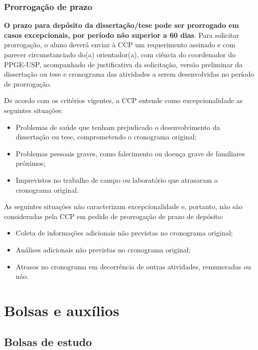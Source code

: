 \subsection{Prorrogação de prazo}

\textbf{O prazo para depósito da dissertação/tese pode ser prorrogado
  em casos excepcionais, por período não superior a 60 dias}. Para
solicitar prorrogação, o aluno deverá enviar à CCP um requerimento
assinado e com parecer circunstanciado do(a) orientador(a), com
ciência do coordenador do PPGE-USP, acompanhado de justificativa da
solicitação, versão preliminar da dissertação ou tese e cronograma das
atividades a serem desenvolvidas no período de prorrogação.

De acordo com os critérios vigentes, a CCP entende como
excepcionalidade as seguintes situações:

\begin{itemize}
\item Problemas de saúde que tenham prejudicado o desenvolvimento da
  dissertação ou tese, comprometendo o cronograma original;
\item Problemas pessoais graves, como falecimento ou doença grave de
  familiares próximos;
\item Imprevistos no trabalho de campo ou laboratório que atrasaram o
  cronograma original.
\end{itemize}

As seguintes situações não caracterizam excepcionalidade e, portanto,
não são consideradas pela CCP em pedido de prorrogação de prazo de
depósito:

\begin{itemize}
\item Coleta de informações adicionais não previstas no cronograma
  original;
\item Análises adicionais não previstas no cronograma original;
\item Atrasos no cronograma em decorrência de outras atividades,
  remuneradas ou não.
\end{itemize}

\chapter{Bolsas e auxílios}

\section{Bolsas de estudo}
\label{sec:bolsas}

